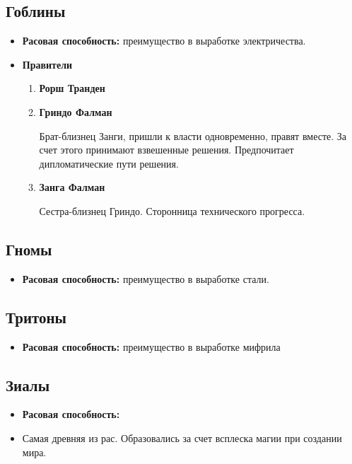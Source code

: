\documentclass[a4paper,12pt,landscape]{article}
\begin{document}
    \subsection{Гоблины}
    \begin{itemize}
      \item \textbf{Расовая способность:} преимущество в выработке электричества.
      \item \textbf{Правители}
        \begin{enumerate} 
          \item \textbf{Рорш Транден}
          \item \textbf{Гриндо Фалман}
          
          Брат-близнец Занги, пришли к власти одновременно, правят вместе. За счет этого принимают взвешенные решения. Предпочитает дипломатические пути решения.
          \item \textbf{Занга Фалман}
          
          Сестра-близнец Гриндо. Сторонница технического прогресса.
        \end{enumerate}
    \end{itemize}
    
    \subsection{Гномы}
    \begin{itemize}
      \item \textbf{Расовая способность:} преимущество в выработке стали.      
    \end{itemize}
    
    \subsection{Тритоны}
    \begin{itemize}
      \item \textbf{Расовая способность:} преимущество в выработке мифрила
    \end{itemize}
    
    \subsection{Зиалы}
    \begin {itemize}
      \item \textbf{Расовая способность:} 
      \item Самая древняя из рас. Образовались за счет всплеска магии при создании мира.
    \end{itemize}
\end{document}
